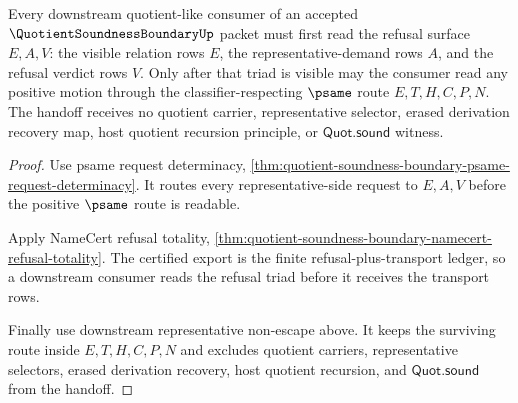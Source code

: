 \begin{theorem}
\label{thm:quotient-soundness-boundary-consumer-scope-triad}
Every downstream quotient-like consumer of an accepted $\QuotientSoundnessBoundaryUp$ packet must first read the refusal surface $E,A,V$: the visible relation rows $E$, the representative-demand rows $A$, and the refusal verdict rows $V$. Only after that triad is visible may the consumer read any positive motion through the classifier-respecting $\psame$ route $E,T,H,C,P,N$. The handoff receives no quotient carrier, representative selector, erased derivation recovery map, host quotient recursion principle, or $\mathsf{Quot.sound}$ witness.
\end{theorem}
\begin{proof}
Use psame request determinacy, \autoref{thm:quotient-soundness-boundary-psame-request-determinacy}. It routes every representative-side request to $E,A,V$ before the positive $\psame$ route is readable.

Apply NameCert refusal totality, \autoref{thm:quotient-soundness-boundary-namecert-refusal-totality}. The certified export is the finite refusal-plus-transport ledger, so a downstream consumer reads the refusal triad before it receives the transport rows.

Finally use downstream representative non-escape above. It keeps the surviving route inside $E,T,H,C,P,N$ and excludes quotient carriers, representative selectors, erased derivation recovery, host quotient recursion, and $\mathsf{Quot.sound}$ from the handoff.
\end{proof}

